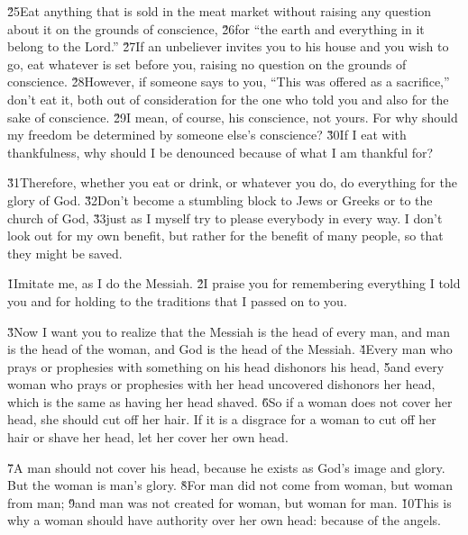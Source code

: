 \v{25}Eat anything that is sold in the meat market without raising any question about it on the grounds of conscience, \v{26}for ``the earth and everything in it belong to the Lord.'' \v{27}If an unbeliever invites you to his house and you wish to go, eat whatever is set before you, raising no question on the grounds of conscience. \v{28}However, if someone says to you, ``This was offered as a sacrifice,'' don't eat it, both out of consideration for the one who told you and also for the sake of conscience. \v{29}I mean, of course, his conscience, not yours. For why should my freedom be determined by someone else's conscience? \v{30}If I eat with thankfulness, why should I be denounced because of what I am thankful for?

\v{31}Therefore, whether you eat or drink, or whatever you do, do everything for the glory of God. \v{32}Don't become a stumbling block to Jews or Greeks or to the church of God, \v{33}just as I myself try to please everybody in every way. I don't look out for my own benefit, but rather for the benefit of many people, so that they might be saved.

\v{1}Imitate me, as I do the Messiah. \v{2}I praise you for remembering everything I told you and for holding to the traditions that I passed on to you.

\v{3}Now I want you to realize that the Messiah is the head of every man, and man is the head of the woman, and God is the head of the Messiah. \v{4}Every man who prays or prophesies with something on his head dishonors his head, \v{5}and every woman who prays or prophesies with her head uncovered dishonors her head, which is the same as having her head shaved. \v{6}So if a woman does not cover her head, she should cut off her hair. If it is a disgrace for a woman to cut off her hair or shave her head, let her cover her own head.

\v{7}A man should not cover his head, because he exists as God's image and glory. But the woman is man's glory. \v{8}For man did not come from woman, but woman from man; \v{9}and man was not created for woman, but woman for man. \v{10}This is why a woman should have authority over her own head: because of the angels.

